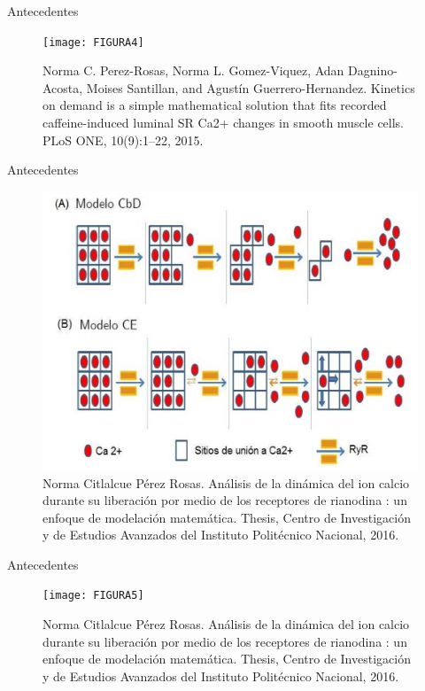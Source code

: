 \begin{frame}{Antecedentes}
	
	\begin{figure}[h]
		\texttt{[image: FIGURA4]}
		\caption{{\tiny Norma C. Perez-Rosas, Norma L. Gomez-Viquez, Adan Dagnino-Acosta, Moises Santillan,
				and Agustín Guerrero-Hernandez. Kinetics on demand is a simple mathematical solution
				that fits recorded caffeine-induced luminal SR Ca2+ changes in smooth muscle cells. PLoS
				ONE, 10(9):1–22, 2015.}}
	\end{figure}
	
\end{frame}

\begin{frame}{Antecedentes}
	
	\begin{figure}[h]
		\includegraphics[width=.8\textwidth]{FIGURA12}
		\caption{{\tiny Norma Citlalcue Pérez Rosas. Análisis de la dinámica del ion calcio durante su liberación por
				medio de los receptores de rianodina : un enfoque de modelación matemática. Thesis, Centro de
				Investigación y de Estudios Avanzados del Instituto Politécnico Nacional, 2016.}}
	\end{figure}
	
\end{frame}

\begin{frame}{Antecedentes}
	
	\begin{figure}[h]
		\texttt{[image: FIGURA5]}
		\caption{{\tiny Norma Citlalcue Pérez Rosas. Análisis de la dinámica del ion calcio durante su liberación por
				medio de los receptores de rianodina : un enfoque de modelación matemática. Thesis, Centro de
				Investigación y de Estudios Avanzados del Instituto Politécnico Nacional, 2016.}}
	\end{figure}
	
\end{frame}

